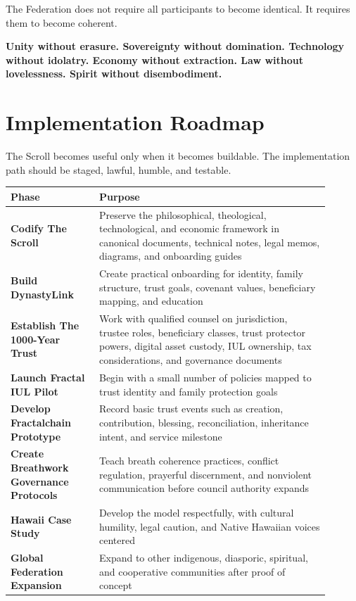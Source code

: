 \documentclass[12pt]{article}
\begin{document}
The Federation does not require all participants to become identical. It requires them to become coherent.

\begin{center}
\textbf{Unity without erasure. Sovereignty without domination. Technology without idolatry. Economy without extraction. Law without lovelessness. Spirit without disembodiment.}
\end{center}

\section{Implementation Roadmap}

The Scroll becomes useful only when it becomes buildable. The implementation path should be staged, lawful, humble, and testable.

\aftRoadmapGraphic

\begin{longtable}{>{\bfseries}p{0.25\linewidth}p{0.65\linewidth}}
\toprule
Phase & Purpose \\
\midrule
Codify The Scroll & Preserve the philosophical, theological, technological, and economic framework in canonical documents, technical notes, legal memos, diagrams, and onboarding guides \\
Build DynastyLink & Create practical onboarding for identity, family structure, trust goals, covenant values, beneficiary mapping, and education \\
Establish The 1000-Year Trust & Work with qualified counsel on jurisdiction, trustee roles, beneficiary classes, trust protector powers, digital asset custody, IUL ownership, tax considerations, and governance documents \\
Launch Fractal IUL Pilot & Begin with a small number of policies mapped to trust identity and family protection goals \\
Develop Fractalchain Prototype & Record basic trust events such as creation, contribution, blessing, reconciliation, inheritance intent, and service milestone \\
Create Breathwork Governance Protocols & Teach breath coherence practices, conflict regulation, prayerful discernment, and nonviolent communication before council authority expands \\
Hawaii Case Study & Develop the model respectfully, with cultural humility, legal caution, and Native Hawaiian voices centered \\
Global Federation Expansion & Expand to other indigenous, diasporic, spiritual, and cooperative communities after proof of concept \\
\bottomrule
\end{longtable}
\end{document}
